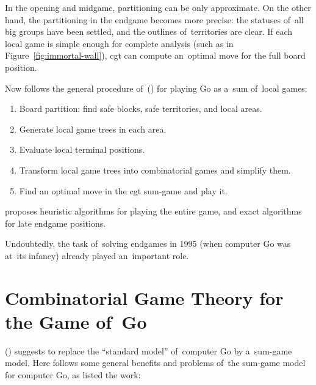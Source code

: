 In the opening and midgame, partitioning can be only approximate.
On the other hand, the partitioning in the endgame becomes more precise:
the statuses of~all big groups have been settled, and the outlines of~territories are clear.
If each local game is simple enough for complete analysis (such as in Figure~\ref{fig:immortal-wall}), \acrshort{cgt} can compute an~optimal move for the full board position.

Now follows the general procedure of~(\cite{Muller1995computer}) for playing Go as a~sum of~local games:
\begin{enumerate}
  \item Board partition: find safe blocks, safe territories, and local areas.
  \item Generate local game trees in each area.
  \item Evaluate local terminal positions.
  \item Transform local game trees into combinatorial games and simplify them.
  \item Find an optimal move in the \acrshort{cgt} sum-game and play it.
\end{enumerate}
\Mueller{} proposes heuristic algorithms for playing the entire game, and exact algorithms for late endgame positions.

Undoubtedly, the task of~solving endgames in 1995 (when computer Go was at~its infancy) already played an~important role.

\section{Combinatorial Game Theory for the Game of~Go}
(\cite{Muller1995computer}) suggests to replace the ``standard model'' of~computer Go by a~sum-game model.
Here follows some general benefits and problems of~the sum-game model for computer Go, as listed the work:

\medskip

